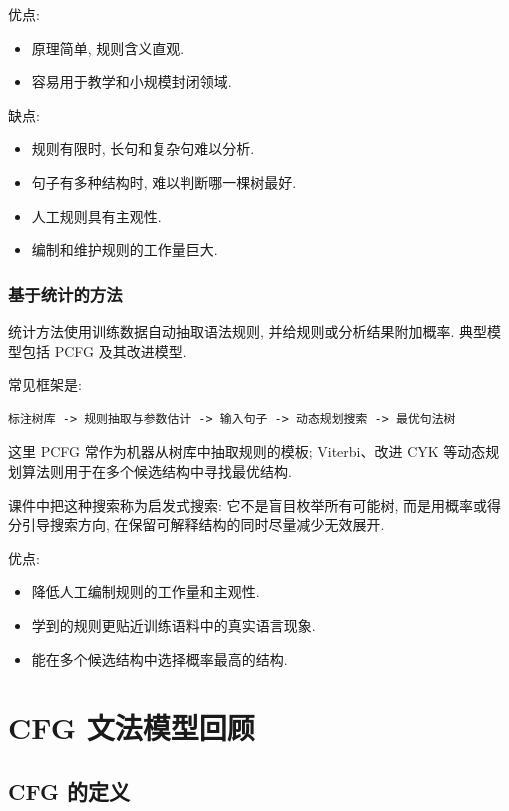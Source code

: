 优点:

\begin{itemize}
\item 原理简单, 规则含义直观.
\item 容易用于教学和小规模封闭领域.
\end{itemize}

缺点:

\begin{itemize}
\item 规则有限时, 长句和复杂句难以分析.
\item 句子有多种结构时, 难以判断哪一棵树最好.
\item 人工规则具有主观性.
\item 编制和维护规则的工作量巨大.
\end{itemize}

\subsubsection{基于统计的方法}


统计方法使用训练数据自动抽取语法规则, 并给规则或分析结果附加概率.
典型模型包括 PCFG 及其改进模型.

常见框架是:

\begin{Verbatim}[breaklines=true,breakanywhere=true,fontsize=\small]
标注树库 -> 规则抽取与参数估计 -> 输入句子 -> 动态规划搜索 -> 最优句法树
\end{Verbatim}

这里 PCFG 常作为机器从树库中抽取规则的模板;
Viterbi、改进 CYK 等动态规划算法则用于在多个候选结构中寻找最优结构.

课件中把这种搜索称为启发式搜索:
它不是盲目枚举所有可能树, 而是用概率或得分引导搜索方向,
在保留可解释结构的同时尽量减少无效展开.

优点:

\begin{itemize}
\item 降低人工编制规则的工作量和主观性.
\item 学到的规则更贴近训练语料中的真实语言现象.
\item 能在多个候选结构中选择概率最高的结构.
\end{itemize}

\section{CFG 文法模型回顾}


\subsection{CFG 的定义}


